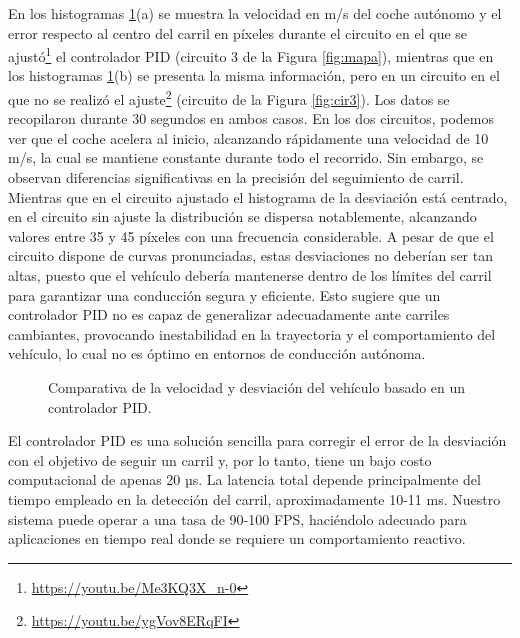 En los histogramas \ref{fig:comparativa_pid}(a) se muestra la velocidad en m/s del coche autónomo y el error respecto al centro del carril en píxeles durante el circuito en el que se ajustó\footnote{\url{https://youtu.be/Me3KQ3X_n-0}} el controlador \ac{PID} (circuito 3 de la Figura \ref{fig:mapa}), mientras que en los histogramas \ref{fig:comparativa_pid}(b) se presenta la misma información, pero en un circuito en el que no se realizó el ajuste\footnote{\url{https://youtu.be/ygVov8ERqFI}} (circuito de la Figura \ref{fig:cir3}). Los datos se recopilaron durante 30 segundos en ambos casos. En los dos circuitos, podemos ver que el coche acelera al inicio, alcanzando rápidamente una velocidad de 10 m/s, la cual se mantiene constante durante todo el recorrido. Sin embargo, se observan diferencias significativas en la precisión del seguimiento de carril. Mientras que en el circuito ajustado el histograma de la desviación está centrado, en el circuito sin ajuste la distribución se dispersa notablemente, alcanzando valores entre 35 y 45 píxeles con una frecuencia considerable. A pesar de que el circuito dispone de curvas pronunciadas, estas desviaciones no deberían ser tan altas, puesto que el vehículo debería mantenerse dentro de los límites del carril para garantizar una conducción segura y eficiente. Esto sugiere que un controlador \ac{PID} no es capaz de generalizar adecuadamente ante carriles cambiantes, provocando inestabilidad en la trayectoria y el comportamiento del vehículo, lo cual no es óptimo en entornos de conducción autónoma.

\begin{figure}[ht]
\centering
{}
\hfill
{}
\caption{Comparativa de la velocidad y desviación del vehículo basado en un controlador \ac{PID}.}
\label{fig:comparativa_pid}
\end{figure}

\newpage

El controlador \ac{PID} es una solución sencilla para corregir el error de la desviación con el objetivo de seguir un carril y, por lo tanto, tiene un bajo costo computacional de apenas 20 µs. La latencia total depende principalmente del tiempo empleado en la detección del carril, aproximadamente 10-11 ms. Nuestro sistema puede operar a una tasa de 90-100 \ac{FPS}, haciéndolo adecuado para aplicaciones en tiempo real donde se requiere un comportamiento reactivo.


